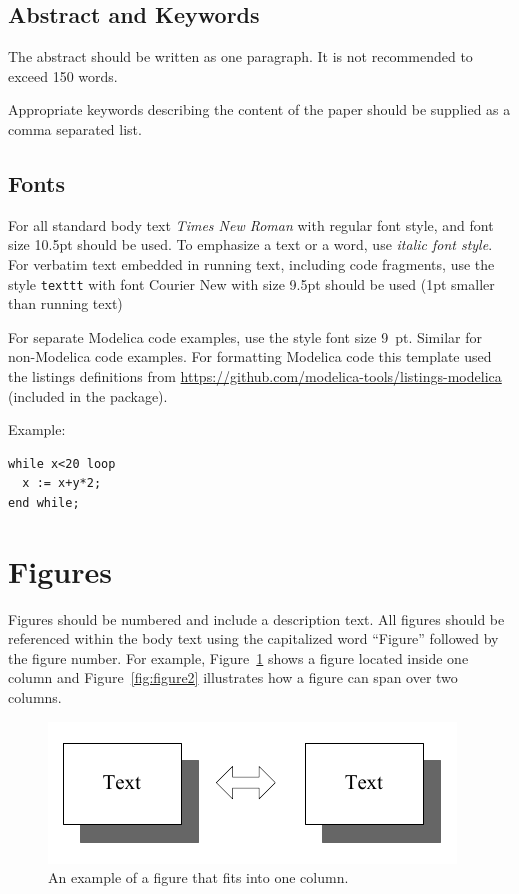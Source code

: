 \documentclass{modelica}
\begin{document}
\subsection{Abstract and Keywords}

The abstract should be written as one paragraph. It is not recommended
to exceed 150 words.

Appropriate keywords describing the content of the paper should be
supplied as a comma separated list.

\subsection{Fonts}

For all standard body text \emph{Times New Roman} with regular font style, and font size 10.5pt should be used. To emphasize a text or a word, use \emph{italic font style}. For verbatim text embedded in running text, including code fragments, use the style {\small\texttt{texttt}} with font Courier New with size 9.5pt should be used (1pt smaller than running text)

For separate Modelica code examples, use the style font size 9~pt.  Similar for non-Modelica code examples. For formatting Modelica code this template used the listings definitions from {\small\url{https://github.com/modelica-tools/listings-modelica}} (included in the package).

Example:

\begin{lstlisting}
while x<20 loop
  x := x+y*2;
end while;
\end{lstlisting}

\section{Figures}

Figures should be numbered and include a description text. All figures
should be referenced within the body text using the capitalized word
``Figure'' followed by the figure number. For example,
Figure~\ref{fig:figure1} shows a figure located inside one column and
Figure~\ref{fig:figure2} illustrates how a figure can span over two
columns.

\begin{figure}[b]
\centering
\includegraphics[width=0.4 \textwidth]{resources/figure1}
\caption{An example of a figure that fits into one column.}
\label{fig:figure1}
\end{figure}
\end{document}
